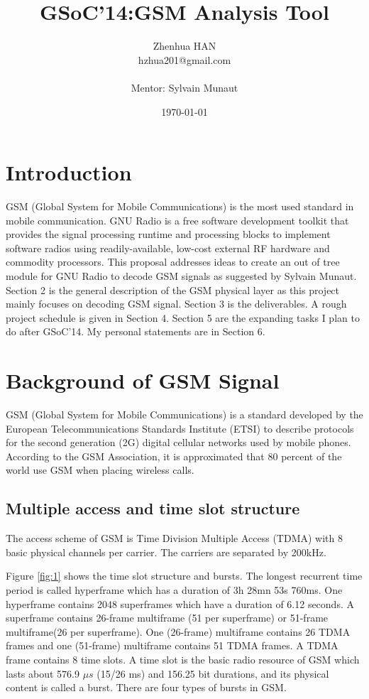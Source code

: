 \documentclass[a4paper,12pt,oneside]{article}
\title{GSoC'14:GSM Analysis Tool}
\date{\today}
\author{Zhenhua HAN\\ hzhua201@gmail.com\\ \\Mentor: Sylvain Munaut}
\begin{document}
\maketitle
\tableofcontents
\newpage
\section{Introduction}
GSM (Global System for Mobile Communications) is the most used standard in mobile communication. GNU Radio is a free software development toolkit that provides the signal processing runtime and processing blocks to implement software radios using readily-available, low-cost external RF hardware and commodity processors.\cite{gnuradio} This proposal addresses ideas to create an out of tree module for GNU Radio to decode GSM signals as suggested by Sylvain Munaut. Section 2 is the general description of the GSM physical layer as this project mainly focuses on decoding GSM signal. Section 3 is the deliverables.
A rough project schedule is given in Section 4. Section 5 are the expanding tasks I plan to do after GSoC'14. My personal statements are in Section 6.
\section{Background of GSM Signal}
GSM (Global System for Mobile Communications) is a standard developed by the European Telecommunications Standards Institute (ETSI) to describe protocols for the second generation (2G) digital cellular networks used by mobile phones. According to the GSM Association\cite{gsma}, it is approximated that 80 percent of the world use GSM when placing wireless calls.

\subsection{Multiple access and time slot structure}
The access scheme of GSM is Time Division Multiple Access (TDMA) with 8 basic physical channels per carrier. The carriers are separated by 200kHz.

Figure \ref{fig:1} shows the time slot structure and bursts. The longest recurrent time period is called hyperframe which has a duration of 3h 28mn 53s 760ms. One hyperframe contains 2048 superframes which have a duration of 6.12 seconds. A superframe contains 26-frame multiframe (51 per superframe) or 51-frame multiframe(26 per superframe). One (26-frame) multiframe contains 26 TDMA frames and one (51-frame) multiframe contains 51 TDMA frames. A TDMA frame contains 8 time slots. A time slot is the basic radio resource of GSM which lasts about 576.9 $\mu s$ (15/26 ms) and 156.25 bit durations, and its physical content is called a burst. There are four types of bursts in GSM.
\end{document}
